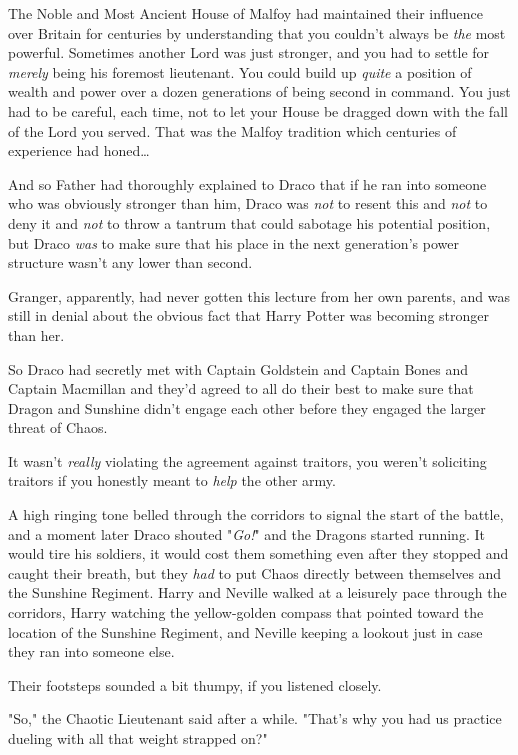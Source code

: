 The Noble and Most Ancient House of Malfoy had maintained their influence over 
Britain for centuries by understanding that you couldn't always be \emph{the} 
most powerful. Sometimes another Lord was just stronger, and you had to settle 
for \emph{merely} being his foremost lieutenant. You could build up 
\emph{quite} a position of wealth and power over a dozen generations of being 
second in command. You just had to be careful, each time, not to let your House 
be dragged down with the fall of the Lord you served. That was the Malfoy 
tradition which centuries of experience had honed{\ldots}

And so Father had thoroughly explained to Draco that if he ran into someone who 
was obviously stronger than him, Draco was \emph{not} to resent this and 
\emph{not} to deny it and \emph{not} to throw a tantrum that could sabotage his 
potential position, but Draco \emph{was} to make sure that his place in the 
next generation's power structure wasn't any lower than second.

Granger, apparently, had never gotten this lecture from her own parents, and 
was still in denial about the obvious fact that Harry Potter was becoming 
stronger than her.

So Draco had secretly met with Captain Goldstein and Captain Bones and Captain 
Macmillan and they'd agreed to all do their best to make sure that Dragon and 
Sunshine didn't engage each other before they engaged the larger threat of 
Chaos.

It wasn't \emph{really} violating the agreement against traitors, you weren't 
soliciting traitors if you honestly meant to \emph{help} the other army.

A high ringing tone belled through the corridors to signal the start of the 
battle, and a moment later Draco shouted "\emph{Go!}" and the Dragons started 
running. It would tire his soldiers, it would cost them something even after 
they stopped and caught their breath, but they \emph{had} to put Chaos directly 
between themselves and the Sunshine Regiment.
\sbreak
Harry and Neville walked at a leisurely pace through the corridors, Harry 
watching the yellow-golden compass that pointed toward the location of the 
Sunshine Regiment, and Neville keeping a lookout just in case they ran into 
someone else.

Their footsteps sounded a bit thumpy, if you listened closely.

"So," the Chaotic Lieutenant said after a while. "That's why you had us 
practice dueling with all that weight strapped on?"

